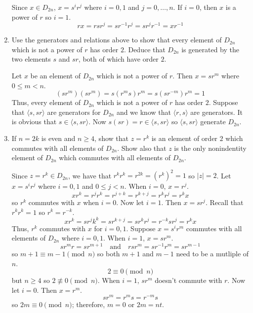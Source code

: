 \begin{enumerate}
  \par\smallskip
  Since \(x\in D_{2n}\), \(x = s^ir^j\) where \(i = 0,1\) and
  \(j = 0,\ldots,n\).
  If \(i = 0\), then \(x\) is a power of \(r\) so \(i = 1\).
  \[
  rx = rsr^j = sr^{-1}r^j = sr^jr^{-1} = xr^{-1}
  \]
\item
  \label{ex3}
  Use the generators and relations above to show that every element of
  \(D_{2n}\) which is not a power of \(r\) has order \(2\).
  Deduce that \(D_{2n}\) is generated by the two elements \(s\) and \(sr\),
  both of which have order \(2\).
  \par\smallskip
  Let \(x\) be an element of \(D_{2n}\) which is not a power of \(r\).
  Then \(x = sr^m\) where \(0\leq m < n\).
  \[
  (sr^m)(sr^m) = s(r^ms)r^m = s(sr^{-m})r^m = 1
  \]
  Thus, every element of \(D_{2n}\) which is not a power of \(r\) has order
  \(2\).
  Suppose that \(\langle s,sr\rangle\) are generators for \(D_{2n}\) and we
  know that \(\langle r,s\rangle\) are generators.
  It is obvious that \(s\in\langle s,sr\rangle\).
  Now \(s(sr) = r\in\langle s,sr\rangle\) so \(\langle s,sr\rangle\) generate
  \(D_{2n}\).
\item
  \label{ex4}
  If \(n = 2k\) is even and \(n\geq 4\), show that \(z = r^k\) is an element of
  order \(2\) which commutes with all elements of \(D_{2n}\).
  Show also that \(z\) is the only nonindentity element of \(D_{2n}\) which
  commutes with all elements of \(D_{2n}\).
  \par\smallskip
  Since \(z = r^k\in D_{2n}\), we have that
  \(r^kr^k = r^{2k} = (r^k)^2 = 1\) so \(\lvert z\rvert = 2\).
  Let \(x = s^ir^j\) where \(i = 0,1\) and \(0\leq j < n\).
  When \(i = 0\), \(x = r^j\).
  \[
  xr^k = r^jr^k = r^{j + k} = r^{k + j} = r^kr^j = r^kx
  \]
  so \(r^k\) commutes with \(x\) when \(i = 0\).
  Now let \(i = 1\).
  Then \(x = sr^j\).
  Recall that \(r^kr^k = 1\) so \(r^k = r^{-k}\).
  \[
  xr^k = sr^jk^k = sr^{k + j} = sr^kr^j = r^{-k}sr^j = r^kx
  \]
  Thus, \(r^k\) commutes with \(x\) for \(i = 0,1\).
  Suppose \(x = s^ir^m\) commutes with all elements of \(D_{2n}\) where
  \(i = 0,1\).
  When \(i = 1\), \(x = sr^m\).
  \[
  sr^mr = sr^{m + 1}\quad\text{and}\quad rsr^m = sr^{-1}r^m = sr^{m - 1}
  \]
  so \(m + 1 \equiv m - 1\pmod{n}\) so both \(m + 1\) and \(m - 1\) need to be
  a mutliple of \(n\).
  \[
  2\equiv 0\pmod{n}
  \]
  but \(n\geq 4\) so \(2\not\equiv 0\pmod{n}\).
  When \(i = 1\), \(sr^m\) doesn't commute with \(r\).
  Now let \(i = 0\).
  Then \(x = r^m\).
  \[
  sr^m = r^ms = r^{-m}s
  \]
  so \(2m\equiv 0\pmod{n}\); therefore, \(m = 0\) or \(2m = nt\).

\end{enumerate}
